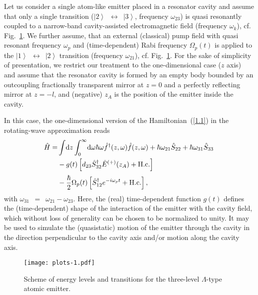 \documentclass[pra, twocolumn]{revtex4}
\newcommand{\D}{\mbox{\rm d}}
\newcommand{\ket}[1]{$\left|#1\right\rangle$}
\begin{document}
Let us consider a single atom-like emitter placed in a resonator cavity
and assume that only a single transition
(\mbox{\ket{2} $\!\leftrightarrow$ \!\ket{3}}, frequency $\omega_{23}$)
is quasi resonantly
coupled to a narrow-band cavity-assisted electromagnetic field
(frequency $\omega_k$), cf. Fig.~\ref{fig1}.
We further assume, that an external (classical) pump field with
quasi resonant frequency $\omega_p$ and
(time-dependent)
Rabi frequency
$\Omega_p(t)$ is applied to the
\mbox{\ket{1} $\!\leftrightarrow$ \!\ket{2}}
transition (frequency $\omega_{21}$), cf. Fig.~\ref{fig1}.
%
For the sake of simplicity of presentation, we restrict our treatment to
the one-dimensional case ($z$ axis) and assume that the resonator cavity
is formed by an empty body
bounded
by an outcoupling fractionally transparent mirror at $z=0$ and
a perfectly reflecting mirror at $z=-l$,
and (negative) $z_A$ is the position of the emitter
inside the cavity.

In this case,
the  one-dimensional version of the Hamiltonian~(\ref{1.1}) in the
rotating-wave approximation reads
\begin{align}
   \label{1.15}
        \hat{H} =
&
        \int\! \D z\int_0^\infty\! \D\omega
      \hbar\omega\hat {f}^{\dagger}(z, \omega)
      \hat{f}(z, \omega)
+ \hbar \omega _{21} \hat {S}_{22} + \hbar \omega _{31} \hat {S}_{33}
\nonumber\\&
  -g(t)\left[
        d_{23}\hat{S}_{32}^{\dagger}
            \hat{E}^{(+)}(z_A)
            +
\mbox{H.c.} \right]
\nonumber\\[.5ex]
&
-
\frac{\hbar}{2}
\Omega_p
(t)\left[
        \hat{S}_{12}^{\dagger}
            e^{-i\omega_p t}
            +
\mbox{H.c.} \right],
\end{align}
with \mbox{$\omega _{31} $ $\!=$ $\omega _{21}- \omega _{23}$}.
Here,
the (real) time-dependent
function $g(t)$ defines the (time-dependent)
shape
of the
interaction of the emitter with the cavity field, which without loss
of generality can be
chosen to be
normalized to unity.
It may be used to
simulate the (quasistatic) motion of the emitter through the
cavity in the direction perpendicular to the cavity axis and/or motion
along the cavity axis.

\begin{figure}[t!]
        \texttt{[image: plots-1.pdf]}
        \caption{
          \label{fig1}
          Scheme of energy levels and transitions for the three-level
          $\Lambda$-type atomic emitter.}
      \end{figure}
\end{document}
